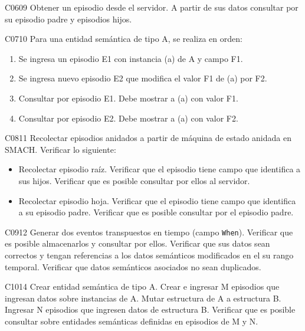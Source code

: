 \begin{def-validacion}{C}{06}{09}
	Obtener un episodio desde el servidor. A partir de sus datos consultar por su episodio padre y episodios hijos.	
\end{def-validacion}

\begin{def-validacion}{C}{07}{10}
	Para una entidad semántica de tipo A, se realiza en orden:
	\begin{enumerate}
		\item Se ingresa un episodio E1 con instancia (a) de A y campo F1.
		\item Se ingresa nuevo episodio E2 que modifica el valor F1 de (a) por F2.
		\item Consultar por episodio E1. Debe mostrar a (a) con valor F1.
		\item Consultar por episodio E2. Debe mostrar a (a) con valor F2.
	\end{enumerate}
\end{def-validacion}

\begin{def-validacion}{C}{08}{11}
	Recolectar episodios anidados a partir de máquina de estado anidada en SMACH. Verificar lo siguiente:
	\begin{itemize}
		\item Recolectar episodio raíz. Verificar que el episodio tiene campo que identifica a sus hijos. Verificar que es posible consultar por ellos al servidor.
		\item Recolectar episodio hoja. Verificar que el episodio tiene campo que identifica a su episodio padre. Verificar que es posible consultar por el episodio padre.
	\end{itemize}
\end{def-validacion}

\begin{def-validacion}{C}{09}{12}
	Generar dos eventos transpuestos en tiempo (campo \texttt{When}). Verificar que es posible almacenarlos y consultar por ellos. Verificar que sus datos sean correctos y tengan referencias a los datos semánticos modificados en el su rango temporal. Verificar que datos semánticos asociados no sean duplicados.
\end{def-validacion}

\begin{def-validacion}{C}{10}{14}
	Crear entidad semántica de tipo A. Crear e ingresar M episodios que ingresan datos sobre  instancias de A. Mutar estructura de A a estructura B. Ingresar N episodios que ingresen datos de estructura B. Verificar que es posible consultar sobre entidades semánticas definidas en episodios de M y N.
\end{def-validacion}


